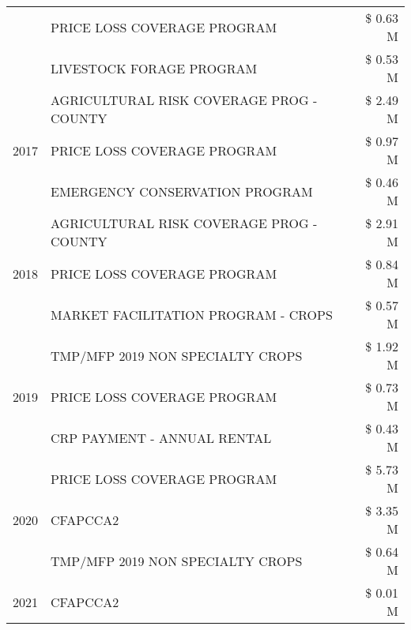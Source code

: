 \begin{tabular}{llr}
 & PRICE LOSS COVERAGE PROGRAM                   & \$ 0.63 M \\
 & LIVESTOCK FORAGE PROGRAM                      & \$ 0.53 M \\
\cline{1-3}
\multirow[t]{3}{*}{2017} & AGRICULTURAL RISK COVERAGE PROG - COUNTY & \$ 2.49 M \\
 & PRICE LOSS COVERAGE PROGRAM & \$ 0.97 M \\
 & EMERGENCY CONSERVATION PROGRAM & \$ 0.46 M \\
\cline{1-3}
\multirow[t]{3}{*}{2018} & AGRICULTURAL RISK COVERAGE PROG - COUNTY & \$ 2.91 M \\
 & PRICE LOSS COVERAGE PROGRAM & \$ 0.84 M \\
 & MARKET FACILITATION PROGRAM - CROPS & \$ 0.57 M \\
\cline{1-3}
\multirow[t]{3}{*}{2019} & TMP/MFP 2019 NON SPECIALTY CROPS & \$ 1.92 M \\
 & PRICE LOSS COVERAGE PROGRAM & \$ 0.73 M \\
 & CRP PAYMENT - ANNUAL RENTAL & \$ 0.43 M \\
\cline{1-3}
\multirow[t]{3}{*}{2020} & PRICE LOSS COVERAGE PROGRAM & \$ 5.73 M \\
 & CFAPCCA2 & \$ 3.35 M \\
 & TMP/MFP 2019 NON SPECIALTY CROPS & \$ 0.64 M \\
\cline{1-3}
2021 & CFAPCCA2 & \$ 0.01 M \\
\cline{1-3}
\bottomrule
\end{tabular}

